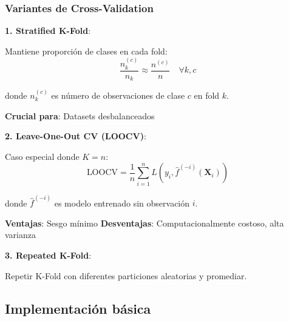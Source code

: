 \documentclass[
  doc,
  floatsintext,
  longtable,
  a4paper,
  nolmodern,
  notxfonts,
  notimes,
  12pt,
  colorlinks=true,linkcolor=blue,citecolor=blue,urlcolor=blue]{apa7}
\begin{document}
\subsubsection{Variantes de
Cross-Validation}\label{variantes-de-cross-validation}

\textbf{1. Stratified K-Fold}:

Mantiene proporción de clases en cada fold: \[
\frac{n_k^{(c)}}{n_k} \approx \frac{n^{(c)}}{n} \quad \forall k, c
\]

donde \(n_k^{(c)}\) es número de observaciones de clase \(c\) en fold
\(k\).

\textbf{Crucial para}: Datasets desbalanceados

\textbf{2. Leave-One-Out CV (LOOCV)}:

Caso especial donde \(K = n\): \[
\text{LOOCV} = \frac{1}{n} \sum_{i=1}^{n} L(y_i, \hat{f}^{(-i)}(\mathbf{X}_i))
\]

donde \(\hat{f}^{(-i)}\) es modelo entrenado sin observación \(i\).

\textbf{Ventajas}: Sesgo mínimo \textbf{Desventajas}: Computacionalmente
costoso, alta varianza

\textbf{3. Repeated K-Fold}:

Repetir K-Fold con diferentes particiones aleatorias y promediar.

\subsection{Implementación básica}\label{implementaciuxf3n-buxe1sica}
\end{document}

